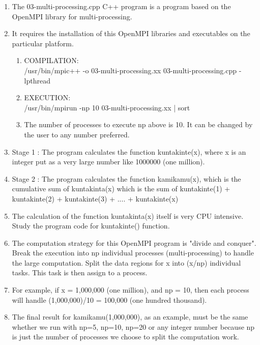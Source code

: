 \begin{enumerate}
	\item The 03-multi-processing.cpp C++ program is a program based on the OpenMPI library for multi-processing.
	
	\item It requires the installation of this OpenMPI libraries and executables on the particular platform.
	
	\begin{enumerate}
		
		\item COMPILATION:\\ 
		/usr/bin/mpic++ -o 03-multi-processing.xx 03-multi-processing.cpp -lpthread
		
		\item EXECUTION:\\
		/usr/bin/mpirun -np 10 03-multi-processing.xx | sort
		
		\item The number of processes to execute np above is 10. It can be changed by the user to any number preferred.
		
	\end{enumerate}
	
	\item Stage 1 : The program calculates the function kuntakinte(x), where x is an integer put as a very large number like 1000000 (one million).
	
	\item Stage 2 : The program calculates the function kamikamu(x), which is the cumulative sum of kuntakinta(x) which is the sum of kuntakinte(1) + kuntakinte(2) + kuntakinte(3) + .... + kuntakinte(x)
	
	\item The calculation of the function kuntakinta(x) itself is very CPU intensive. Study the program code for kuntakinte() function.
	
	\item The computation strategy for this OpenMPI program is "divide and conquer". Break the execution into np individual processes (multi-processing) to handle the large computation. Split the data regions for x into (x/np) individual tasks. This task is then assign to a process.
	
	\item For example, if x = 1,000,000 (one million), and np = 10, then each process will handle (1,000,000)/10 = 100,000 (one hundred thousand).
	
	\item The final result for kamikamu(1,000,000), as an example, must be the same whether we run with np=5, np=10, np=20 or any integer number because np is just the number of processes we choose to split the computation work.
	

\end{enumerate}
